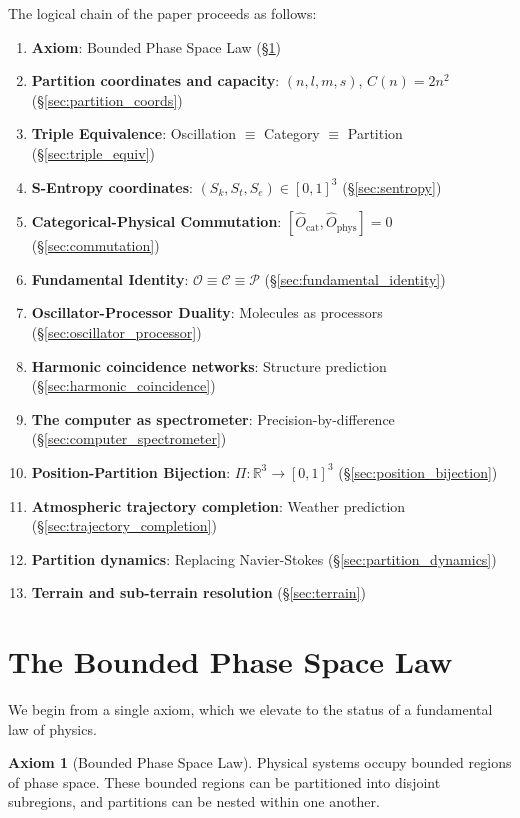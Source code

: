 \documentclass[twocolumn,10pt]{article}
\theoremstyle{definition}
\newtheorem{axiom}{Axiom}
\newcommand{\Obs}{\mathcal{O}}
\newcommand{\Comp}{\mathcal{C}}
\newcommand{\Proc}{\mathcal{P}}
\newcommand{\Sk}{S_k}
\newcommand{\St}{S_t}
\newcommand{\Se}{S_e}
\newcommand{\R}{\mathbb{R}}
\newcommand{\Ocat}{\hat{O}_{\mathrm{cat}}}
\newcommand{\Ophys}{\hat{O}_{\mathrm{phys}}}
\begin{document}
The logical chain of the paper proceeds as follows:
\begin{enumerate}[nosep]
    \item \textbf{Axiom}: Bounded Phase Space Law (\S\ref{sec:axiom})
    \item \textbf{Partition coordinates and capacity}: $(n,l,m,s)$, $C(n)=2n^2$ (\S\ref{sec:partition_coords})
    \item \textbf{Triple Equivalence}: Oscillation $\equiv$ Category $\equiv$ Partition (\S\ref{sec:triple_equiv})
    \item \textbf{S-Entropy coordinates}: $(\Sk,\St,\Se) \in [0,1]^3$ (\S\ref{sec:sentropy})
    \item \textbf{Categorical-Physical Commutation}: $[\Ocat, \Ophys] = 0$ (\S\ref{sec:commutation})
    \item \textbf{Fundamental Identity}: $\Obs \equiv \Comp \equiv \Proc$ (\S\ref{sec:fundamental_identity})
    \item \textbf{Oscillator-Processor Duality}: Molecules as processors (\S\ref{sec:oscillator_processor})
    \item \textbf{Harmonic coincidence networks}: Structure prediction (\S\ref{sec:harmonic_coincidence})
    \item \textbf{The computer as spectrometer}: Precision-by-difference (\S\ref{sec:computer_spectrometer})
    \item \textbf{Position-Partition Bijection}: $\Pi: \R^3 \to [0,1]^3$ (\S\ref{sec:position_bijection})
    \item \textbf{Atmospheric trajectory completion}: Weather prediction (\S\ref{sec:trajectory_completion})
    \item \textbf{Partition dynamics}: Replacing Navier-Stokes (\S\ref{sec:partition_dynamics})
    \item \textbf{Terrain and sub-terrain resolution} (\S\ref{sec:terrain})
\end{enumerate}

\section{The Bounded Phase Space Law}\label{sec:axiom}

We begin from a single axiom, which we elevate to the status of a fundamental law of physics.

\begin{axiom}[Bounded Phase Space Law]\label{ax:bounded}
Physical systems occupy bounded regions of phase space. These bounded regions can be partitioned into disjoint subregions, and partitions can be nested within one another.
\end{axiom}
\end{document}
